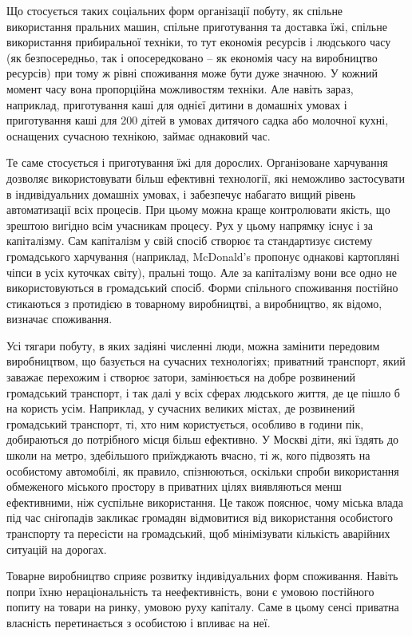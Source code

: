 \documentclass[../main]{subfiles}
\begin{document}
Що стосується таких соціальних форм організації побуту, як спільне використання пральних машин, спільне приготування та доставка їжі, спільне використання прибиральної техніки, то тут економія ресурсів і людського часу (як безпосередньо, так і опосередковано – як економія часу на виробництво ресурсів) при тому ж рівні споживання може бути дуже значною. У кожний момент часу вона пропорційна можливостям техніки. Але навіть зараз, наприклад, приготування каші для однієї дитини в домашніх умовах і приготування каші для 200 дітей в умовах дитячого садка або молочної кухні, оснащених сучасною технікою, займає однаковий час.

Те саме стосується і приготування їжі для дорослих. Організоване харчування дозволяє використовувати більш ефективні технології, які неможливо застосувати в індивідуальних домашніх умовах, і забезпечує набагато вищий рівень автоматизації всіх процесів. При цьому можна краще контролювати якість, що зрештою вигідно всім учасникам процесу. Рух у цьому напрямку існує і за капіталізму. Сам капіталізм у свій спосіб створює та стандартизує систему громадського харчування (наприклад, McDonald's пропонує однакові картопляні чіпси в усіх куточках світу), пральні тощо. Але за капіталізму вони все одно не використовуються в громадський спосіб. Форми спільного споживання постійно стикаються з протидією в товарному виробництві, а виробництво, як відомо, визначає споживання.

Усі тягари побуту, в яких задіяні численні люди, можна замінити передовим виробництвом, що базується на сучасних технологіях; приватний транспорт, який заважає перехожим і створює затори, замінюється на добре розвинений громадський транспорт, і так далі у всіх сферах людського життя, де це пішло б на користь усім. Наприклад, у сучасних великих містах, де розвинений громадський транспорт, ті, хто ним користується, особливо в години пік, добираються до потрібного місця більш ефективно. У Москві діти, які їздять до школи на метро, здебільшого приїжджають вчасно, ті ж, кого підвозять на особистому автомобілі, як правило, спізнюються, оскільки спроби використання обмеженого міського простору в приватних цілях виявляються менш ефективними, ніж суспільне використання. Це також пояснює, чому міська влада під час снігопадів закликає громадян відмовитися від використання особистого транспорту та пересісти на громадський, щоб мінімізувати кількість аварійних ситуацій на дорогах.

Товарне виробництво сприяє розвитку індивідуальних форм споживання. Навіть попри їхню нераціональність та неефективність, вони є умовою постійного попиту на товари на ринку, умовою руху капіталу. Саме в цьому сенсі приватна власність перетинається з особистою і впливає на неї.
\end{document}
